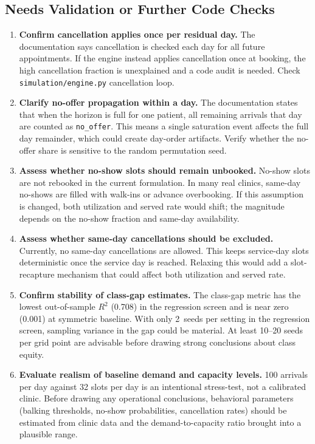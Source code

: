 \documentclass[11pt]{article}
\begin{document}
\subsection{Needs Validation or Further Code Checks}

\vspace{6pt}
\begin{checkenv}
\begin{enumerate}[leftmargin=1.5em, itemsep=4pt]
\item \textbf{Confirm cancellation applies once per residual day.}
The documentation says cancellation is checked each day for all future
appointments. If the engine instead applies cancellation once at booking,
the high cancellation fraction is unexplained and a code audit is needed.
Check \texttt{simulation/engine.py} cancellation loop.

\item \textbf{Clarify no-offer propagation within a day.}
The documentation states that when the horizon is full for one patient,
all remaining arrivals that day are counted as \texttt{no\_offer}. This
means a single saturation event affects the full day remainder, which
could create day-order artifacts. Verify whether the no-offer share is
sensitive to the random permutation seed.

\item \textbf{Assess whether no-show slots should remain unbooked.}
No-show slots are not rebooked in the current formulation. In many
real clinics, same-day no-shows are filled with walk-ins or advance
overbooking. If this assumption is changed, both utilization and served
rate would shift; the magnitude depends on the no-show fraction and
same-day availability.

\item \textbf{Assess whether same-day cancellations should be excluded.}
Currently, no same-day cancellations are allowed. This keeps service-day
slots deterministic once the service day is reached. Relaxing this would
add a slot-recapture mechanism that could affect both utilization and
served rate.

\item \textbf{Confirm stability of class-gap estimates.}
The class-gap metric has the lowest out-of-sample $R^2$ (0.708) in the
regression screen and is near zero (0.001) at symmetric baseline. With
only 2~seeds per setting in the regression screen, sampling variance in
the gap could be material. At least 10--20 seeds per grid point are
advisable before drawing strong conclusions about class equity.

\item \textbf{Evaluate realism of baseline demand and capacity levels.}
100 arrivals per day against 32 slots per day is an intentional
stress-test, not a calibrated clinic. Before drawing any operational
conclusions, behavioral parameters (balking thresholds, no-show
probabilities, cancellation rates) should be estimated from clinic data
and the demand-to-capacity ratio brought into a plausible range.
\end{enumerate}
\end{checkenv}
\end{document}
